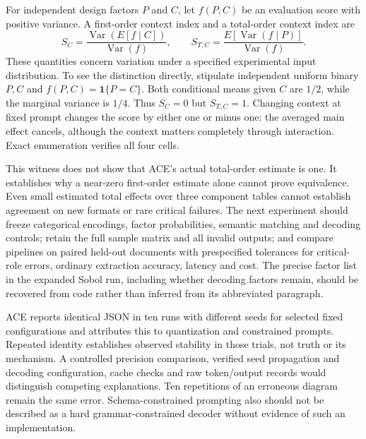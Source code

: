 For independent design factors $P$ and $C$, let $f(P,C)$ be an evaluation score with positive variance. A first-order context index and a total-order context index are
\begin{equation}
 S_C=\frac{\operatorname{Var}(E[f\mid C])}{\operatorname{Var}(f)},
 \qquad
 S_{T,C}=\frac{E[\operatorname{Var}(f\mid P)]}{\operatorname{Var}(f)}.
 \label{exec21:ace-indices}
\end{equation}
These quantities concern variation under a specified experimental input distribution. To see the distinction directly, stipulate independent uniform binary $P,C$ and $f(P,C)=\mathbf 1\{P=C\}$. Both conditional means given $C$ are $1/2$, while the marginal variance is $1/4$. Thus $S_C=0$ but $S_{T,C}=1$. Changing context at fixed prompt changes the score by either one or minus one: the averaged main effect cancels, although the context matters completely through interaction. Exact enumeration verifies all four cells.~\citep{exec21_ace_reference}

This witness does not show that ACE's actual total-order estimate is one. It establishes why a near-zero first-order estimate alone cannot prove equivalence. Even small estimated total effects over three component tables cannot establish agreement on new formats or rare critical failures. The next experiment should freeze categorical encodings, factor probabilities, semantic matching and decoding controls; retain the full sample matrix and all invalid outputs; and compare pipelines on paired held-out documents with prespecified tolerances for critical-role errors, ordinary extraction accuracy, latency and cost. The precise factor list in the expanded Sobol run, including whether decoding factors remain, should be recovered from code rather than inferred from its abbreviated paragraph.

ACE reports identical JSON in ten runs with different seeds for selected fixed configurations and attributes this to quantization and constrained prompts. Repeated identity establishes observed stability in those trials, not truth or its mechanism. A controlled precision comparison, verified seed propagation and decoding configuration, cache checks and raw token/output records would distinguish competing explanations. Ten repetitions of an erroneous diagram remain the same error. Schema-constrained prompting also should not be described as a hard grammar-constrained decoder without evidence of such an implementation.~\citep{exec21_ace}

